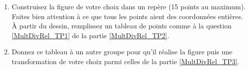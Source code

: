 \begin{TP}[Morphing]
\begin{enumerate}
 \item Construisez la figure de votre choix dans un repère (15 points au maximum). Faites bien attention à ce que tous les points aient des coordonnées entières. À partir du dessin, remplissez un tableau de points comme à la question \ref{MultDivRel_TP1} de la partie \ref{MultDivRel_TP2}.
 \item Donnez ce tableau à un autre groupe pour qu'il réalise la figure puis une transformation de votre choix parmi celles de la partie \ref{MultDivRel_TP3}.
 \end{enumerate}

\end{TP}


